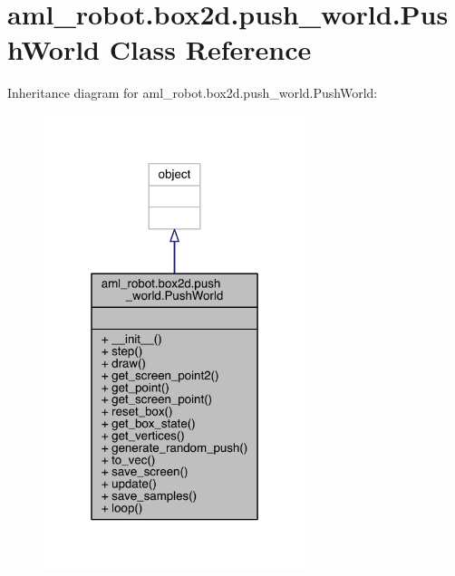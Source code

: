 \hypertarget{classaml__robot_1_1box2d_1_1push__world_1_1_push_world}{}\section{aml\+\_\+robot.\+box2d.\+push\+\_\+world.\+Push\+World Class Reference}
\label{classaml__robot_1_1box2d_1_1push__world_1_1_push_world}


Inheritance diagram for aml\+\_\+robot.\+box2d.\+push\+\_\+world.\+Push\+World\+:\nopagebreak
\begin{figure}[H]
\begin{center}
\leavevmode
\includegraphics[width=217pt]{classaml__robot_1_1box2d_1_1push__world_1_1_push_world__inherit__graph}
\end{center}
\end{figure}


